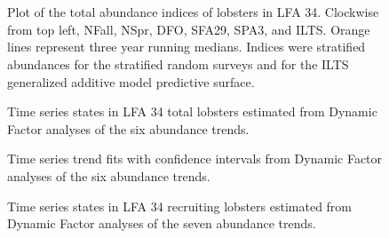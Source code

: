 \documentclass[11pt]{article}
\newcommand{\e}{/SpinDr/backup/bio_data/bio.lobster/figures/LFA3438Framework2019/} %
\begin{document}
\begin{landscape}
\begin{figure}
        \centering
    \\
                \\
        
         \caption{Plot of the total abundance indices of lobsters in LFA 34. Clockwise from top left, NFall, NSpr, DFO, SFA29, SPA3, and ILTS.
         Orange lines represent three year running medians. Indices were stratified abundances for the stratified random surveys and for the ILTS generalized additive model predictive surface.}
        \end{figure}
\end{landscape}

   \begin{figure}
    \centering
        \caption{Time series states in LFA 34 total lobsters estimated from Dynamic Factor analyses of the six abundance trends.}

    \end{figure}

\begin{figure}
    \centering
        \caption{Time series trend fits with confidence intervals from Dynamic Factor analyses of the six abundance trends.}

    \end{figure}


   \begin{figure}
    \centering
        \caption{Time series states in LFA 34 recruiting lobsters estimated from Dynamic Factor analyses of the seven abundance trends.}

    \end{figure}
\end{document}
